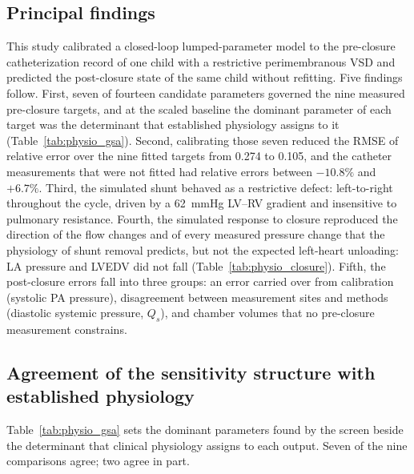 \documentclass{article}
\begin{document}
\subsection{Principal findings}
This study calibrated a closed-loop lumped-parameter model to the pre-closure catheterization record of one child with a restrictive perimembranous VSD and predicted the post-closure state of the same child without refitting. Five findings follow. First, seven of fourteen candidate parameters governed the nine measured pre-closure targets, and at the scaled baseline the dominant parameter of each target was the determinant that established physiology assigns to it (Table~\ref{tab:physio_gsa}). Second, calibrating those seven reduced the RMSE of relative error over the nine fitted targets from 0.274 to 0.105, and the catheter measurements that were not fitted had relative errors between $-10.8\%$ and $+6.7\%$. Third, the simulated shunt behaved as a restrictive defect: left-to-right throughout the cycle, driven by a 62~mmHg LV--RV gradient and insensitive to pulmonary resistance. Fourth, the simulated response to closure reproduced the direction of the flow changes and of every measured pressure change that the physiology of shunt removal predicts, but not the expected left-heart unloading: LA pressure and LVEDV did not fall (Table~\ref{tab:physio_closure}). Fifth, the post-closure errors fall into three groups: an error carried over from calibration (systolic PA pressure), disagreement between measurement sites and methods (diastolic systemic pressure, $Q_s$), and chamber volumes that no pre-closure measurement constrains.

\subsection{Agreement of the sensitivity structure with established physiology}
Table~\ref{tab:physio_gsa} sets the dominant parameters found by the screen beside the determinant that clinical physiology assigns to each output. Seven of the nine comparisons agree; two agree in part.
\end{document}
